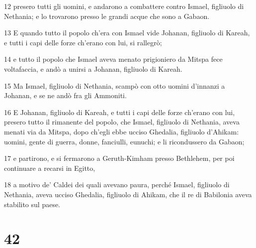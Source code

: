 \par 12 presero tutti gli uomini, e andarono a combattere contro Ismael, figliuolo di Nethania; e lo trovarono presso le grandi acque che sono a Gabaon.
\par 13 E quando tutto il popolo ch'era con Ismael vide Johanan, figliuolo di Kareah, e tutti i capi delle forze ch'erano con lui, si rallegrò;
\par 14 e tutto il popolo che Ismael aveva menato prigioniero da Mitspa fece voltafaccia, e andò a unirsi a Johanan, figliuolo di Kareah.
\par 15 Ma Ismael, figliuolo di Nethania, scampò con otto uomini d'innanzi a Johanan, e se ne andò fra gli Ammoniti.
\par 16 E Johanan, figliuolo di Kareah, e tutti i capi delle forze ch'erano con lui, presero tutto il rimanente del popolo, che Ismael, figliuolo di Nethania, aveva menati via da Mitspa, dopo ch'egli ebbe ucciso Ghedalia, figliuolo d'Ahikam: uomini, gente di guerra, donne, fanciulli, eunuchi; e li ricondussero da Gabaon;
\par 17 e partirono, e si fermarono a Geruth-Kimham presso Bethlehem, per poi continuare a recarsi in Egitto,
\par 18 a motivo de' Caldei dei quali avevano paura, perché Ismael, figliuolo di Nethania, aveva ucciso Ghedalia, figliuolo di Ahikam, che il re di Babilonia aveva stabilito sul paese.

\chapter{42}


